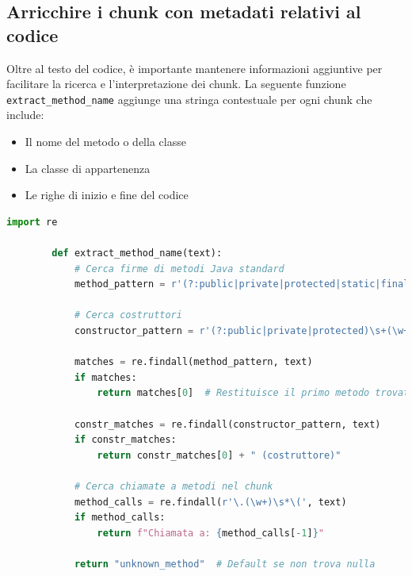 \documentclass[12pt,a4paper,openright,twoside]{book}
\begin{document}
        \subsection{Arricchire i chunk con metadati relativi al codice}
        Oltre al testo del codice, è importante mantenere informazioni aggiuntive per facilitare la ricerca e l'interpretazione dei chunk.
        La seguente funzione \texttt{extract\_method\_name} aggiunge una stringa contestuale per ogni chunk che include:
        \begin{itemize}
            \item Il nome del metodo o della classe
            \item La classe di appartenenza
            \item Le righe di inizio e fine del codice
        \end{itemize}
        
        \begin{lstlisting}[language=Python, caption={Funzione extract\_method\_name}]
        import re
        
        def extract_method_name(text):
            # Cerca firme di metodi Java standard
            method_pattern = r'(?:public|private|protected|static|final|synchronized|abstract|native)\s+[\w<>\[\]]+\s+(\w+)\s*\([^)]*\)'
            
            # Cerca costruttori
            constructor_pattern = r'(?:public|private|protected)\s+(\w+)\s*\([^)]*\)'
            
            matches = re.findall(method_pattern, text)
            if matches:
                return matches[0]  # Restituisce il primo metodo trovato
            
            constr_matches = re.findall(constructor_pattern, text)
            if constr_matches:
                return constr_matches[0] + " (costruttore)"
            
            # Cerca chiamate a metodi nel chunk
            method_calls = re.findall(r'\.(\w+)\s*\(', text)
            if method_calls:
                return f"Chiamata a: {method_calls[-1]}"
            
            return "unknown_method"  # Default se non trova nulla
    \end{lstlisting}
        
\end{document}
